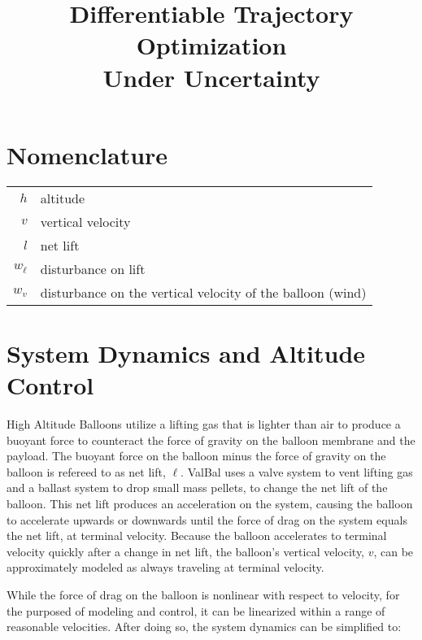 \documentclass[11pt]{scrartcl} %
\title{\bfseries Differentiable Trajectory Optimization\\ Under Uncertainty}
\author{}
\date{}
\begin{document}
\maketitle

\def\States{\mathcal{S}}
\def\Altitudes{\mathcal{H}}
\def\Velocities{\mathcal{V}}
\def\Lifts{\mathcal{L}}
\newcommand{\mx}[2]{\left[ \begin{array}{#1} #2 \end{array} \right]}

\section{Nomenclature}
\begin{tabular}{rl}
$h$ & altitude  \\
$v$ & vertical velocity\\
$l$ & net lift \\
$w_{\dot \ell}$ & disturbance on lift \\
$w_{v}$ & disturbance on the vertical velocity of the balloon (wind) \\
\end{tabular}

\section{System Dynamics and Altitude Control}

High Altitude Balloons utilize a lifting gas that is lighter than air to produce a buoyant force to counteract the force of gravity on the balloon membrane and the payload. The buoyant force on the balloon minus the force of gravity on the balloon is refereed to as net lift, $\ell$. ValBal uses a valve system to vent lifting gas and a ballast system to drop small mass pellets, to change the net lift of the balloon. This net lift produces an acceleration on the system, causing the balloon to accelerate upwards or downwards until the force of drag on the system equals the net lift, at terminal velocity. Because the balloon accelerates to terminal velocity quickly after a change in net lift, the balloon's vertical velocity, $v$, can be approximately modeled as always traveling at terminal velocity.

While the force of drag on the balloon is nonlinear with respect to velocity, for the purposed of modeling and control, it can be linearized within a range of reasonable velocities. After doing so, the system dynamics can be simplified to:
\end{document}
